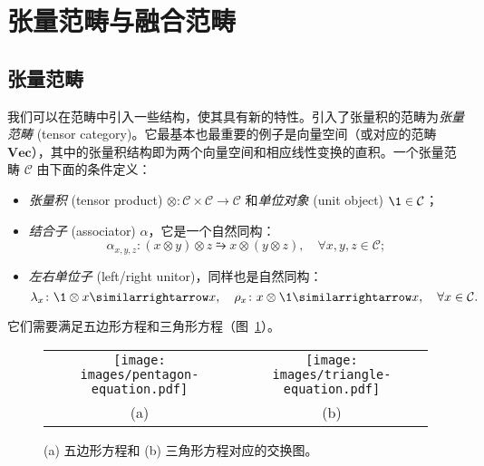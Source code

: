 \section{张量范畴与融合范畴}
\label{sec:tensor-category-fusion-category}

\subsection{张量范畴}

我们可以在范畴中引入一些结构，使其具有新的特性。引入了张量积的范畴为\emph{张量范畴} (tensor category)\cite{bakalov2001lectures,muger2008tensor,maclane2013categories,beer2018categories,kong2022invitation}。它最基本也最重要的例子是向量空间（或对应的范畴 $\mathbf{Vec}$），其中的张量积结构即为两个向量空间和相应线性变换的直积。一个张量范畴 $\mathcal{C}$ 由下面的条件定义：
\begin{itemize}
  \item \emph{张量积} (tensor product) $\otimes\colon\mathcal{C}\times\mathcal{C}\to\mathcal{C}$ 和\emph{单位对象} (unit object) $\1\in\mathcal{C}$；
  \item \emph{结合子} (associator) $\alpha$，它是一个自然同构：
    \begin{equation}
      \alpha_{x,y,z} \colon (x\otimes y)\otimes z \similarrightarrow x\otimes(y\otimes z), \quad \forall x,y,z \in \mathcal{C};
    \end{equation}
  \item \emph{左右单位子} (left/right unitor)，同样也是自然同构：
    \begin{equation}
      \lambda_x \colon \1\otimes x \similarrightarrow x, \quad
      \rho_x    \colon x\otimes\1  \similarrightarrow x, \quad
      \forall x \in \mathcal{C}.
    \end{equation}
\end{itemize}
它们需要满足五边形方程和三角形方程（图~\ref{fig:pentagon-triangle-equation}）。

\begin{figure}[htb]
  \centering
  \begin{tabular}{cc}
    \texttt{[image: images/pentagon-equation.pdf]} &
    \texttt{[image: images/triangle-equation.pdf]} \\
    (a) & (b)
  \end{tabular}
  \caption[五边形方程和三角形方程对应的交换图]{(a) 五边形方程和 (b) 三角形方程对应的交换图。}
  \label{fig:pentagon-triangle-equation}
\end{figure}

